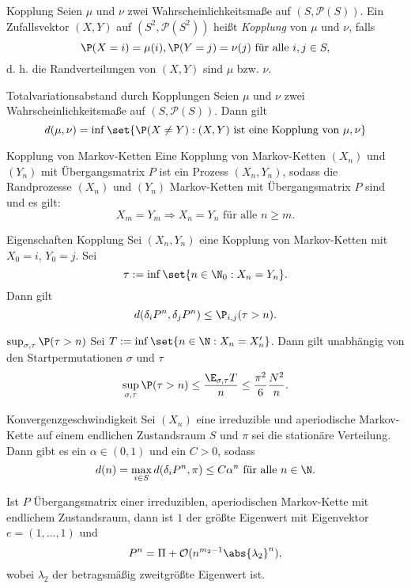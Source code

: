 \begin{karte}{Kopplung}
    Seien \(\mu\) und \(\nu\) zwei Wahrscheinlichkeitsmaße auf \((S,\mathcal{P}(S))\). 
    Ein Zufallsvektor \((X,Y)\) auf \((S^2, \mathcal{P}(S^2))\) heißt \textit{Kopplung} 
    von \(\mu\) und \(\nu\), falls 
    \[ \P(X=i) = \mu(i), \P(Y=j)=\nu(j) \text{ für alle } i,j\in S, \]
    d. h. die Randverteilungen von \((X,Y)\) sind \(\mu\) bzw. \(\nu\).
\end{karte}

\begin{karte}{Totalvariationsabstand durch Kopplungen}
    Seien \(\mu\) und \(\nu\) zwei Wahrscheinlichkeitsmaße auf \((S,\mathcal{P}(S))\). 
    Dann gilt 
    \[ d(\mu,\nu) = \inf \set{\P(X\neq Y) : (X,Y) \text{ ist eine Kopplung von } \mu,\nu} \]
\end{karte}

\begin{karte}{Kopplung von Markov-Ketten}
    Eine Kopplung von Markov-Ketten \((X_n)\) und \((Y_n)\) mit Übergangsmatrix 
    \(P\) ist ein Prozess \((X_n,Y_n)\), sodass die Randprozesse \((X_n)\) und \((Y_n)\)
    Markov-Ketten mit Übergangsmatrix \(P\) sind und es gilt: 
    \[ X_m = Y_m \Rightarrow X_n = Y_n \text{ für alle } n\geq m. \]
\end{karte}

\begin{karte}{Eigenschaften Kopplung} %
    Sei \((X_n,Y_n)\) eine Kopplung von Markov-Ketten mit \(X_0 = i\), 
    \(Y_0 = j\). Sei 
    \[ \tau := \inf \set{n\in \N_0: X_n = Y_n}. \]
    Dann gilt 
    \[ d(\delta_i P^n, \delta_j P^n) \leq \P_{i,j}(\tau > n). \]
\end{karte}

\begin{karte}{\( \sup_{\sigma,\tau} \P(\tau > n) \)}
    Sei \(T := \inf \set{n\in \N: X_n = X_n'}\). Dann gilt unabhängig von den Startpermutationen \(\sigma\) 
    und \(\tau\)
    \[ \sup_{\sigma,\tau} \P(\tau > n) \leq \frac{\E_{\sigma,\tau} T}{n} 
    \leq \frac{\pi^2}{6} \frac{N^2}{n}. \]
\end{karte}

\begin{karte}{Konvergenzgeschwindigkeit}
    Sei \((X_n)\) eine irreduzible und aperiodische Markov-Kette auf 
    einem endlichen Zustandsraum \(S\) und \(\pi\) sei die stationäre Verteilung. 
    Dann gibt es ein \(\alpha \in (0,1)\) und ein \(C>0\), sodass
    \[ d(n) = \max_{i\in S} d(\delta_i P^n, \pi) \leq C \alpha^n \text{ für alle } n\in\N. \]

    Ist \(P\) Übergangsmatrix einer irreduziblen, aperiodischen Markov-Kette 
    mit endlichem Zustandsraum, dann ist \(1\) der größte Eigenwert 
    mit Eigenvektor \(e=(1,\ldots, 1)\) und 
    \[ P^n = \Pi + \mathcal{O}(n^{m_2 - 1} \abs{\lambda_2}^n), \]
    wobei \(\lambda_2\) der betragsmäßig zweitgrößte Eigenwert ist.
\end{karte}